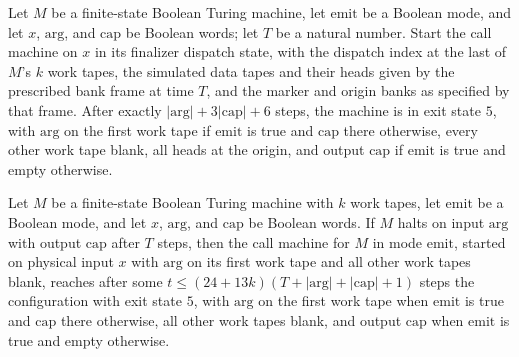 \begin{lemma}
\label{Turing.FinTM.emCall_finalize_run}
\leanok
{}
Let $M$ be a finite-state Boolean Turing machine, let $\mathrm{emit}$ be a Boolean mode,
and let $x$, $\mathrm{arg}$, and $\mathrm{cap}$ be Boolean words; let $T$ be a natural
number. Start the call machine on $x$ in its finalizer dispatch state, with the dispatch
index at the last of $M$'s $k$ work tapes, the simulated data tapes and their heads
given by the prescribed bank frame at time $T$, and the marker and origin banks as
specified by that frame. After exactly $|\mathrm{arg}|+3|\mathrm{cap}|+6$ steps, the
machine is in exit state $5$, with $\mathrm{arg}$ on the first work tape if
$\mathrm{emit}$ is true and $\mathrm{cap}$ there otherwise, every other work tape blank,
all heads at the origin, and output $\mathrm{cap}$ if $\mathrm{emit}$ is true and empty
otherwise.
\end{lemma}

\begin{lemma}
\label{Turing.FinTM.emCall_complete}
\leanok
{}
Let $M$ be a finite-state Boolean Turing machine with $k$ work tapes, let
$\mathrm{emit}$ be a Boolean mode, and let $x$, $\mathrm{arg}$, and $\mathrm{cap}$ be
Boolean words. If $M$ halts on input $\mathrm{arg}$ with output $\mathrm{cap}$ after $T$
steps, then the call machine for $M$ in mode $\mathrm{emit}$, started on physical input
$x$ with $\mathrm{arg}$ on its first work tape and all other work tapes blank, reaches
after some $t \le (24+13k)(T+|\mathrm{arg}|+|\mathrm{cap}|+1)$ steps the configuration
with exit state $5$, with $\mathrm{arg}$ on the first work tape when $\mathrm{emit}$ is
true and $\mathrm{cap}$ there otherwise, all other work tapes blank, and output
$\mathrm{cap}$ when $\mathrm{emit}$ is true and empty otherwise.
\end{lemma}

